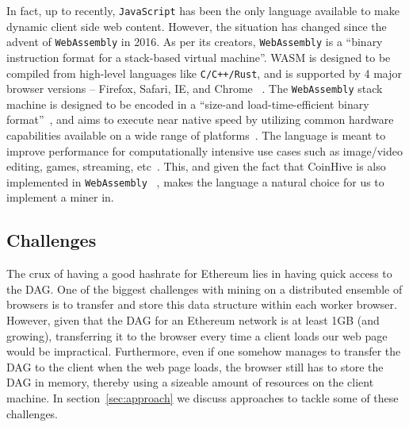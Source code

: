 \documentclass[runningheads]{llncs}
\newcommand{\trishita}[1]{}%
\begin{document}
In fact, up to recently, \verb|JavaScript| has been the only language available to make dynamic client side web content. However, the situation has changed since the advent of \verb|WebAssembly| in 2016. As per its creators, \verb|WebAssembly| is a ``binary instruction format for a stack-based virtual machine''. WASM is designed to be compiled from high-level languages like \verb|C/C++/Rust|, and is supported by 4 major browser versions -- Firefox, Safari, IE, and Chrome ~\cite{webAssembly}. The \verb|WebAssembly| stack machine is designed to be encoded in a ``size-and load-time-efficient binary format''~\cite{webAssembly}, and aims to execute near native speed by utilizing common hardware capabilities available on a wide range of platforms~\cite{webAssembly}. The language is meant to improve performance for computationally intensive use cases such as image/video editing, games, streaming, etc~\cite{webAssembly}. This, and given the fact that CoinHive is also implemented in \verb|WebAssembly| ~\cite{coinhive}, makes the language a natural choice for us to implement a miner in. 

\subsection{Challenges}
The crux of having a good hashrate for Ethereum lies in having quick access to the DAG. One of the biggest challenges with mining on a distributed ensemble of browsers is to transfer and store this data structure within each worker browser. However, given that the DAG for an Ethereum network is at least 1GB (and growing), transferring it to the browser every time a client loads our web page would be impractical. Furthermore, even if one somehow manages to transfer the DAG to the client when the web page loads, the browser still has to store the DAG in memory, thereby using a sizeable amount of resources on the client machine. In section~\ref{sec:approach} we discuss approaches to tackle some of these challenges.
\end{document}
